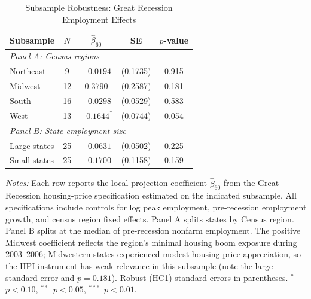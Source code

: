 \begin{table}[H]
\centering
\caption{Subsample Robustness: Great Recession Employment Effects}
\begin{threeparttable}
\small
\begin{tabular}{lcccc}
\toprule
Subsample & $N$ & $\hat{\beta}_{60}$ & SE & $p$-value \\
\midrule
\multicolumn{5}{l}{\textit{Panel A: Census regions}} \\[3pt]
Northeast & 9 & $-0.0194$ & (0.1735) & 0.915 \\
Midwest & 12 & $0.3790$ & (0.2587) & 0.181 \\
South & 16 & $-0.0298$ & (0.0529) & 0.583 \\
West & 13 & $-0.1644^{*}$ & (0.0744) & 0.054 \\
\midrule
\multicolumn{5}{l}{\textit{Panel B: State employment size}} \\[3pt]
Large states & 25 & $-0.0631$ & (0.0502) & 0.225 \\
Small states & 25 & $-0.1700$ & (0.1158) & 0.159 \\
\bottomrule
\end{tabular}
\begin{tablenotes}[flushleft]
\small
\item \textit{Notes:} Each row reports the local projection coefficient $\hat{\beta}_{60}$ from the Great Recession housing-price specification estimated on the indicated subsample. All specifications include controls for log peak employment, pre-recession employment growth, and census region fixed effects. Panel A splits states by Census region. Panel B splits at the median of pre-recession nonfarm employment. The positive Midwest coefficient reflects the region's minimal housing boom exposure during 2003--2006; Midwestern states experienced modest housing price appreciation, so the HPI instrument has weak relevance in this subsample (note the large standard error and $p = 0.181$). Robust (HC1) standard errors in parentheses. $^{*}$~$p<0.10$, $^{**}$~$p<0.05$, $^{***}$~$p<0.01$.
\end{tablenotes}
\end{threeparttable}
\label{tab:subsample}
\end{table}
